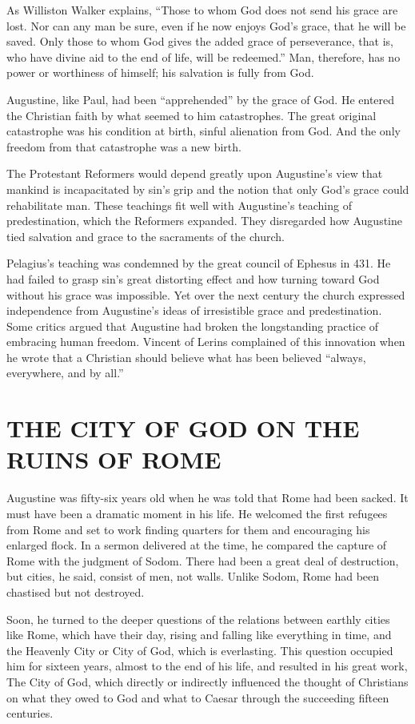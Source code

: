 As Williston Walker explains, “Those to whom God does not send his grace are lost. Nor can any man
be sure, even if he now enjoys God’s grace, that he will be saved. Only those to whom God gives the
added grace of perseverance, that is, who have divine aid to the end of life, will be redeemed.”
Man, therefore, has no power or worthiness of himself; his salvation is fully from God.

Augustine, like Paul, had been “apprehended” by the grace of God. He entered the Christian faith by
what seemed to him catastrophes. The great original catastrophe was his condition at birth, sinful
alienation from God. And the only freedom from that catastrophe was a new birth.

The Protestant Reformers would depend greatly upon Augustine’s view that mankind is incapacitated by
sin’s grip and the notion that only God’s grace could rehabilitate man. These teachings fit well
with Augustine’s teaching of predestination, which the Reformers expanded. They disregarded how
Augustine tied salvation and grace to the sacraments of the church.

Pelagius’s teaching was condemned by the great council of Ephesus in 431. He had failed to grasp
sin’s great distorting effect and how turning toward God without his grace was impossible. Yet over
the next century the church expressed independence from Augustine’s ideas of irresistible grace and
predestination. Some critics argued that Augustine had broken the longstanding practice of embracing
human freedom. Vincent of Lerins complained of this innovation when he wrote that a Christian should
believe what has been believed “always, everywhere, and by all.”

\section{THE CITY OF GOD ON THE RUINS OF ROME}

Augustine was fifty-six years old when he was told that Rome had been sacked. It must have been a
dramatic moment in his life. He welcomed the first refugees from Rome and set to work finding
quarters for them and encouraging his enlarged flock. In a sermon delivered at the time, he compared
the capture of Rome with the judgment of Sodom. There had been a great deal of destruction, but
cities, he said, consist of men, not walls. Unlike Sodom, Rome had been chastised but not destroyed.

Soon, he turned to the deeper questions of the relations between earthly cities like Rome, which
have their day, rising and falling like everything in time, and the Heavenly City or City of God,
which is everlasting. This question occupied him for sixteen years, almost to the end of his life,
and resulted in his great work, The City of God, which directly or indirectly influenced the thought
of Christians on what they owed to God and what to Caesar through the succeeding fifteen centuries.

